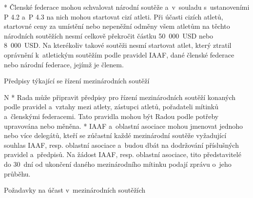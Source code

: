 * Členské federace mohou schvalovat národní soutěže a~v~souladu s~ustanoveními P 4.2 a~P 4.3 na nich mohou startovat cizí atleti. Při účasti cizích atletů, startovné ceny za umístění nebo nepeněžní odměny všem atletům na těchto národních soutěžích nesmí celkově překročit částku 50~000~USD nebo 8~000~USD. Na kterékoliv takové soutěži nesmí startovat atlet, který ztratil oprávnění k~atletickým soutěžím podle pravidel IAAF, dané členské federace nebo národní federace, jejímž je členem.
\enditems

\secc Předpisy týkající se řízení mezinárodních soutěží

\begitems \style N
* Rada může připravit předpisy pro řízení mezinárodních soutěží konaných podle pravidel a~vztahy mezi atlety, zástupci atletů, pořadateli mítinků a~členskými federacemi. Tato pravidla mohou být Radou podle potřeby upravována nebo měněna.
* IAAF a~oblastní asociace mohou jmenovat jednoho nebo více delegátů, kteří se zúčastní každé mezinárodní soutěže vyžadující souhlas IAAF, resp. oblastní asociace a~budou dbát na dodržování příslušných pravidel a~předpisů. Na žádost IAAF, resp. oblastní asociace, tito představitelé do 30~dní od ukončení daného mezinárodního mítinku podají zprávu o~jeho průběhu.
\enditems

\secc Požadavky na účast v~mezinárodních soutěžích

